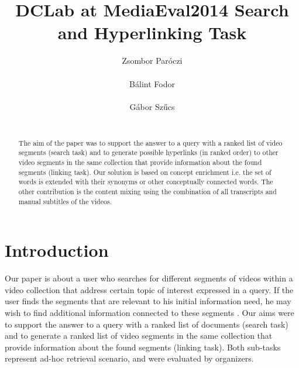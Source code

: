 \documentclass{acm_proc_article-me}
\begin{document}

\title{DCLab at MediaEval2014 Search and Hyperlinking Task}


\author{
\alignauthor
Zsombor Par\'oczi\\
       \\
\alignauthor
B\'alint Fodor\\
       \\
\alignauthor
G\'abor Sz\H ucs \\
       \\
}

\maketitle
\begin{abstract}
The aim of the paper was to support the answer to a query with a ranked list of video segments (search task) and to generate possible hyperlinks (in ranked order) to other video segments in the same collection that provide information about the found segments (linking task). Our solution is based on concept enrichment i.e. the set of words is extended with their synonyms or other conceptually connected words. The other contribution is the content mixing using the combination of all transcripts and manual subtitles of the videos.
\end{abstract}

\section{Introduction}
Our paper is about a user who searches for different segments of videos within a video collection that address certain topic of interest expressed in a query. If the user finds the segments that are relevant to his initial information need, he may wish to find additional information connected to these segments \cite{eskevich2014search}. Our aims were to support the answer to a query with a ranked list of documents (search task) and to generate a ranked list of video segments in the same collection that provide information about the found segments (linking task). Both sub-tasks represent ad-hoc retrieval scenario, and were evaluated by organizers.
\end{document}
